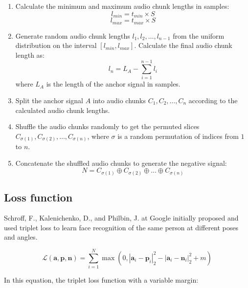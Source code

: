 \begin{enumerate}
\item Calculate the minimum and maximum audio chunk lengths in samples:
\begin{equation}
l_{min} = t_{min} \times S
\end{equation}
\begin{equation}
l_{max} = t_{max} \times S
\end{equation}
\item Generate random audio chunk lengths $l_1, l_2, \ldots, l_{n-1}$ from the uniform distribution on the interval $[l_{min}, l_{max}]$. Calculate the final audio chunk length as:
\begin{equation}
l_n = L_A - \sum_{i=1}^{n-1} l_i
\end{equation}
where $L_A$ is the length of the anchor signal in samples.
\item Split the anchor signal $A$ into audio chunks $C_1, C_2, \ldots, C_n$ according to the calculated audio chunk lengths.
\item Shuffle the audio chunks randomly to get the permuted slices $C_{\sigma(1)}, C_{\sigma(2)}, \ldots, C_{\sigma(n)}$, where $\sigma$ is a random permutation of indices from $1$ to $n$.
\item Concatenate the shuffled audio chunks to generate the negative signal:
\begin{equation}\label{eq:negative_signal}
N = C_{\sigma(1)} \oplus C_{\sigma(2)} \oplus \ldots \oplus C_{\sigma(n)}
\end{equation}
\end{enumerate}

\subsection{Loss function}

Schroff, F., Kalenichenko, D., and Philbin, J. at Google initially proposed and used triplet loss to learn face recognition of the same person at different poses and angles. \cite{Schroff2015FaceNet:Clustering}

\begin{equation}
\mathcal{L}(\mathbf{a}, \mathbf{p}, \mathbf{n}) = \sum_{i=1}^{N} \max \left(0, \left| \mathbf{a}_i - \mathbf{p}_i \right|_2^2 - \left| \mathbf{a}_i - \mathbf{n}_i \right|_2^2 + m \right)
\end{equation}

In this equation, the triplet loss function with a variable margin:

